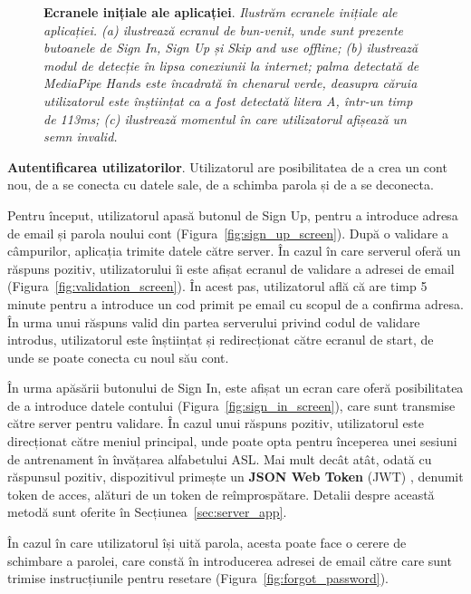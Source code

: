 \begin{figure}[H]
\begin{subfigure}{0.2\textwidth}
    \caption{}
    \label{fig:offline_invalid_detection}
  \end{subfigure}
  \caption[Ecranele inițiale ale aplicației]{\textbf{Ecranele inițiale ale aplicației}. \textit{Ilustrăm ecranele inițiale ale aplicației. (a) ilustrează ecranul de bun-venit, unde sunt prezente butoanele de Sign In, Sign Up și Skip and use offline; (b) ilustrează modul de detecție în lipsa conexiunii la internet; palma detectată de MediaPipe Hands este încadrată în chenarul verde, deasupra căruia utilizatorul este înștiințat ca a fost detectată litera A, într-un timp de 113ms; (c) ilustrează momentul în care utilizatorul afișează un semn invalid.}}
  \label{fig:welcome_screen_offline_det_screen}
\end{figure}

\textbf{Autentificarea utilizatorilor}. Utilizatorul are posibilitatea de a crea un cont nou, de a se conecta cu datele sale, de a schimba parola și de a se deconecta.

Pentru început, utilizatorul apasă butonul de Sign Up, pentru a introduce adresa de email și parola noului cont (Figura~\ref{fig:sign_up_screen}). După o validare a câmpurilor, aplicația trimite datele către server. În cazul în care serverul oferă un răspuns pozitiv, utilizatorului îi este afișat ecranul de validare a adresei de email (Figura~\ref{fig:validation_screen}). În acest pas, utilizatorul află că are timp 5 minute pentru a introduce un cod primit pe email cu scopul de a confirma adresa. În urma unui răspuns valid din partea serverului privind codul de validare introdus, utilizatorul este înștiințat și redirecționat către ecranul de start, de unde se poate conecta cu noul său cont.


În urma apăsării butonului de Sign In, este afișat un ecran care oferă posibilitatea de a introduce datele contului (Figura~\ref{fig:sign_in_screen}), care sunt transmise către server pentru validare. În cazul unui răspuns pozitiv, utilizatorul este direcționat către meniul principal, unde poate opta pentru începerea unei sesiuni de antrenament în învățarea alfabetului ASL. Mai mult decât atât, odată cu răspunsul pozitiv, dispozitivul primește un \textbf{JSON Web Token} (JWT) \cite{jwt}, denumit token de acces, alături de un token de reîmprospătare. Detalii despre această metodă sunt oferite în Secțiunea~\ref{sec:server_app}.


În cazul în care utilizatorul își uită parola, acesta poate face o cerere de schimbare a parolei, care constă în introducerea adresei de email către care sunt trimise instrucțiunile pentru resetare (Figura~\ref{fig:forgot_password}).

